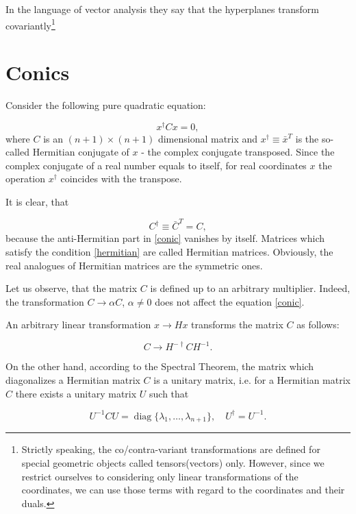 \documentclass[a4paper,10pt]{article}
\newcommand{\diag}{\mathop{\mathrm{diag}}}
\begin{document}
In the language of vector analysis they say that the hyperplanes transform covariantly\footnote{ Strictly speaking, the co/contra-variant transformations are defined for special geometric objects called tensors(vectors) only. However, since we restrict ourselves to considering only linear transformations of the coordinates, we can use those terms with regard to the coordinates and their duals. }

\section{Conics}

Consider the following  pure quadratic equation:

\begin{equation}
 x^\dag C x = 0,\label{conic}
\end{equation}
where  $C$ is an $(n+1) \times (n+1)$ dimensional matrix and $x^\dag \equiv {\bar x}^T$ is the so-called Hermitian conjugate of $x$ - the complex conjugate transposed. Since the complex conjugate of a real number equals to itself,  for real coordinates $x$ the operation $x^\dag$ coincides with the transpose. 

It is clear, that 

\begin{equation}
 C^\dag\equiv {\bar C}^T= C,\label{hermitian}
\end{equation}
because the anti-Hermitian part in \eqref{conic} vanishes by itself.  Matrices which satisfy the condition \eqref{hermitian} are called Hermitian matrices. Obviously, the real analogues of Hermitian matrices are the symmetric ones.

Let us observe, that the matrix $C$ is defined up to an arbitrary multiplier. Indeed, the transformation $C\to \alpha C$, $\alpha\neq 0$ does not affect the equation \eqref{conic}.

An arbitrary linear transformation $x \to H x$ transforms the matrix $C$ as follows:

\begin{equation}
 C \to H^{-\dag} C H^{-1}.\label{ctrans}
\end{equation}

On the other hand, according to the Spectral Theorem, the matrix which diagonalizes a Hermitian matrix $C$ is a unitary matrix, i.e. for a Hermitian matrix $C$ there exists a unitary matrix $U$ such that

\begin{equation}
 U^{-1} C U = \diag\{\lambda_1,\ldots, \lambda_{n+1}\},\quad  U^\dag = U^{-1}.
\end{equation}
\end{document}
